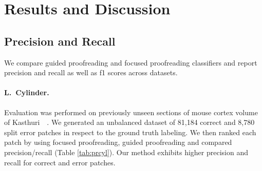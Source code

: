 \section{Results and Discussion}


\subsection{Precision and Recall}

We compare guided proofreading and focused proofreading classifiers and report precision and recall as well as f1 scores across datasets.

\paragraph{L.~Cylinder.} Evaluation was performed on previously unseen sections of mouse cortex volume of Kasthuri~\etal~\cite{kasthuri2015saturated}. We generated an unbalanced dataset of 81,184 correct and 8,780 split error patches in respect to the ground truth labeling. We then ranked each patch by using focused proofreading, guided proofreading and compared precision/recall (Table \ref{tab:prcyl}). Our method exhibits higher precision and recall for correct and error patches.

\begin{table}[t]
\caption{Classifier comparison on an unbalanced test set of the L.~Cylinder volume.}%
\label{tab:prcyl}
\end{table}

